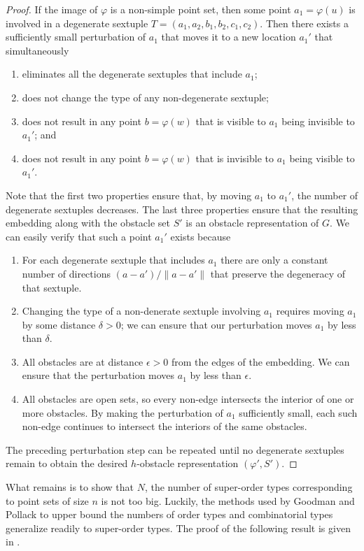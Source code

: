 \documentclass{patmorin}
\begin{document}
\begin{proof}
  If the image of $\varphi$ is a non-simple point set, then some
  point $a_1=\varphi(u)$ is involved in a degenerate sextuple
  $T=(a_1,a_2,b_1,b_2,c_1,c_2)$.  Then there exists a sufficiently
  small perturbation of $a_1$ that moves it to a new location $a_1'$ that
  simultaneously
  \begin{enumerate}
    \item eliminates all the degenerate sextuples that include $a_1$;
    \item does not change the type of any non-degenerate sextuple;
    \item does not result in any point $b=\varphi(w)$ that is visible to $a_1$
      being invisible to $a_1'$; and
    \item does not result in any point $b=\varphi(w)$ that is invisible to $a_1$
      being visible to $a_1'$.
  \end{enumerate}
  Note that the first two properties ensure that, by moving $a_1$ to $a_1'$,
  the number of degenerate sextuples decreases.  The last three properties
  ensure that the resulting embedding along with the obstacle set $S'$
  is an obstacle representation of $G$.  We can easily verify that such
  a point $a_1'$ exists because
  \begin{enumerate}
    \item For each degenerate sextuple that includes $a_1$ there are only
    a constant number of directions $(a-a')/\|a-a'\|$ that preserve the
    degeneracy of that sextuple.
    \item Changing the type of a non-denerate sextuple involving $a_1$
    requires moving $a_1$ by some distance $\delta >0$;  we can ensure
    that our perturbation moves $a_1$ by less than $\delta$.
    \item All obstacles are at distance $\epsilon >0$ from the
    edges of the embedding.  We can ensure that the perturbation moves
    $a_1$ by less than $\epsilon$.
    \item All obstacles are open sets, so every non-edge intersects the
    interior of one or more obstacles.  By making the perturbation of
    $a_1$ sufficiently small, each such non-edge continues to intersect
    the interiors of the same obstacles.
  \end{enumerate}
  The preceding perturbation step can be repeated until no degenerate
  sextuples remain to obtain the desired $h$-obstacle representation
  $(\varphi',S')$.
\end{proof}

What remains is to show that $N$, the number of super-order types
corresponding to point sets of size $n$ is not too big.  Luckily,
the methods used by Goodman and Pollack \cite{goodman.pollack:upper}
to upper bound the numbers of order types and combinatorial types
generalize readily to super-order types.  The proof of the following
result is given in .
\end{document}

